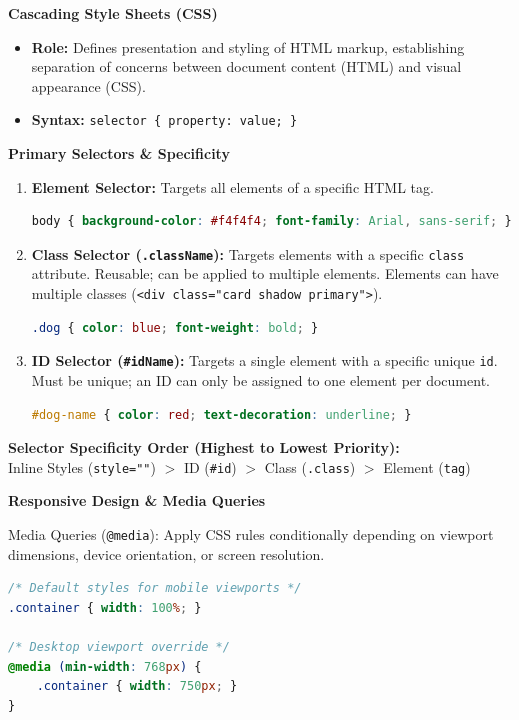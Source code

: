 \documentclass[8pt, a4paper]{article}
\begin{document}
\begin{conceptbox}
\textbf{Cascading Style Sheets (CSS)}
\begin{itemize}
  \item \textbf{Role:} Defines presentation and styling of HTML markup, establishing separation of concerns
        between document content (HTML) and visual appearance (CSS).
  \item \textbf{Syntax:} \texttt{selector \{ property: value; \}}
\end{itemize}
\end{conceptbox}

\begin{conceptbox}
\textbf{Primary Selectors \& Specificity}
\begin{enumerate}
  \item \textbf{Element Selector:} Targets all elements of a specific HTML tag.
\begin{lstlisting}[language=CSS]
body { background-color: #f4f4f4; font-family: Arial, sans-serif; }
\end{lstlisting}
  \item \textbf{Class Selector (\texttt{.className}):} Targets elements with a specific \texttt{class} attribute.
        Reusable; can be applied to multiple elements. Elements can have multiple classes
        (\texttt{<div class="card shadow primary">}).
\begin{lstlisting}[language=CSS]
.dog { color: blue; font-weight: bold; }
\end{lstlisting}
  \item \textbf{ID Selector (\texttt{\#idName}):} Targets a single element with a specific unique \texttt{id}.
        Must be unique; an ID can only be assigned to one element per document.
\begin{lstlisting}[language=CSS]
#dog-name { color: red; text-decoration: underline; }
\end{lstlisting}
\end{enumerate}

\smallskip
\textbf{Selector Specificity Order (Highest to Lowest Priority):}\\
Inline Styles (\texttt{style=""}) $>$ ID (\texttt{\#id}) $>$ Class (\texttt{.class}) $>$ Element (\texttt{tag})
\end{conceptbox}

\begin{conceptbox}
\textbf{Responsive Design \& Media Queries}

Media Queries (\texttt{@media}): Apply CSS rules conditionally depending on viewport dimensions, device
orientation, or screen resolution.

\begin{lstlisting}[language=CSS]
/* Default styles for mobile viewports */
.container { width: 100%; }

/* Desktop viewport override */
@media (min-width: 768px) {
    .container { width: 750px; }
}
\end{lstlisting}
\end{conceptbox}
\end{document}
